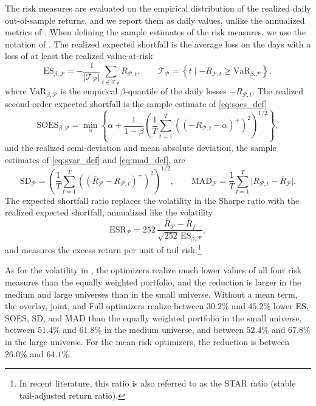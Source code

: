 The risk measures are evaluated on the empirical distribution of the realized daily out-of-sample returns, and we report
them as daily values, unlike the annualized metrics of . When defining the sample estimates of the 
risk measures, we use the notation of
. The realized expected shortfall is the average loss on the days with a
loss of at least the realized value-at-risk
\begin{equation*}
    \mathrm{ES}_{\beta,\mathcal P} = -\frac{1}{|\mathcal T_{\mathcal P}|} \sum_{t \in \mathcal T_{\mathcal P}} R_{\mathcal P,t},
    \qquad \mathcal T_{\mathcal P} = \left\{ t \mid -R_{\mathcal P,t} \ge \mathrm{VaR}_{\beta,\mathcal P} \right\},
\end{equation*}
where $\mathrm{VaR}_{\beta,\mathcal P}$ is the empirical $\beta$-quantile of the daily losses $-R_{\mathcal P,t}$. 
The realized
second-order expected shortfall is the sample estimate of \eqref{eq:soes_def}
\begin{equation*}
    \mathrm{SOES}_{\beta,\mathcal P} = \min_{\alpha} \left\{ \alpha + \frac{1}{1-\beta} \left( \frac{1}{T}
    \sum_{t=1}^{T} \left( \left( -R_{\mathcal P,t} - \alpha \right)^+ \right)^2 \right)^{1/2} \right\},
\end{equation*}
and the realized semi-deviation and mean absolute deviation, the sample estimates of
\eqref{eq:svar_def} and \eqref{eq:mad_def}, are
\begin{equation*}
    \mathrm{SD}_{\mathcal P} = \left( \frac{1}{T} \sum_{t=1}^{T} \left( \left( \bar R_{\mathcal P}
    - R_{\mathcal P,t} \right)^+ \right)^2 \right)^{1/2}, \qquad
    \mathrm{MAD}_{\mathcal P} = \frac{1}{T} \sum_{t=1}^{T} \bigl| R_{\mathcal P,t}
    - \bar R_{\mathcal P} \bigr|.
\end{equation*}
The expected shortfall ratio replaces the volatility in the Sharpe ratio with the realized expected shortfall,
annualized like the volatility
\begin{equation*}
    \mathrm{ESR}_{\mathcal P} = 252\, \frac{\bar R_{\mathcal P} - \bar R_f}{\sqrt{252}\, \mathrm{ES}_{\beta,\mathcal P}},
\end{equation*}
and measures the excess return per unit of tail risk.\footnote{In recent literature, this ratio is also referred to as
the STAR ratio (stable tail-adjusted return ratio).}

As for the volatility in , the optimizers realize much lower values of all four risk
measures than the equally weighted portfolio, and the reduction is larger in the medium and large universes than in
the small universe. Without a mean
term, the overlay, joint, and Full optimizers realize between $30.2\%$ and $45.2\%$ lower ES, SOES, SD, and MAD than the
equally weighted portfolio in the small universe, between $51.4\%$ and $61.8\%$ in the medium universe, and between
$52.4\%$ and $67.8\%$ in the large universe. For the mean-risk optimizers, the reduction is between $26.0\%$ and
$64.1\%$.


